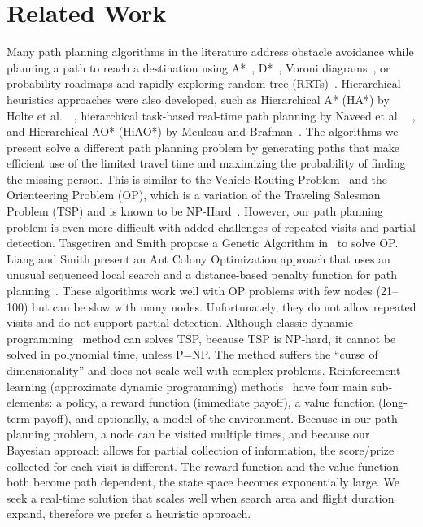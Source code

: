 \section{Related Work}
\label{sec:RelatedWork}

Many path planning algorithms in the literature address obstacle avoidance while planning a path to reach a destination using A*~\cite{Quigley2005Towards}, D*~\cite{Stentz1997Optimal}, Voroni diagrams~\cite{Bortoff2000Path}, or probability roadmaps and rapidly-exploring random tree (RRTs)~\cite{Pettersson2006Probabilistic}. Hierarchical heuristics approaches were also developed, such as Hierarchical A* (HA*) by Holte et al.\ ~\cite{Holte1996Hierarchical}, hierarchical task-based real-time path planning by Naveed et al.\ ~\cite{Meuleau2007Hierarchical}, and Hierarchical-AO* (HiAO*) by Meuleau and Brafman~\cite{Naveed2010Hierarchical}. The algorithms we present solve a different path planning problem by generating paths that make efficient use of the limited travel time and maximizing the probability of finding the missing person. This is similar to the Vehicle Routing Problem~\cite{Laporte1992Vehicle} and the Orienteering Problem (OP), which is a variation of the Traveling Salesman Problem (TSP) and is known to be NP-Hard~\cite{Sokkappa1990Cost}. However, our path planning problem is even more difficult with added challenges of repeated visits and partial detection. 
Tasgetiren and Smith propose a Genetic Algorithm in~\cite{Tasgetiren2000Genetic} to solve OP. Liang and Smith present an Ant Colony Optimization approach that uses an unusual sequenced local search and a distance-based penalty function for path planning~\cite{Liang2006Ant}. These algorithms work well with OP problems with few nodes (21--100) but can be slow with many nodes. Unfortunately, they do not allow repeated visits and do not support partial detection. Although classic dynamic programming~\cite{sniedovich2010dynamic} method can solves TSP, because TSP is NP-hard, it cannot be solved in polynomial time, unless P=NP. The method suffers the ``curse of dimensionality'' and does not scale well with complex problems. Reinforcement learning (approximate dynamic programming) methods~\cite{Bertsekas1995Dynamic,Sutton1998Reinforcement} have four main sub-elements: a policy, a reward function (immediate payoff), a value function (long-term payoff), and optionally, a model of the environment. Because in our path planning problem, a node can be visited multiple times, and because our Bayesian approach allows for partial collection of information, the score/prize collected for each visit is different. The reward function and the value function both become path dependent, the state space becomes exponentially large. We seek a real-time solution that scales well when search area and flight duration expand, therefore we prefer a heuristic approach.

